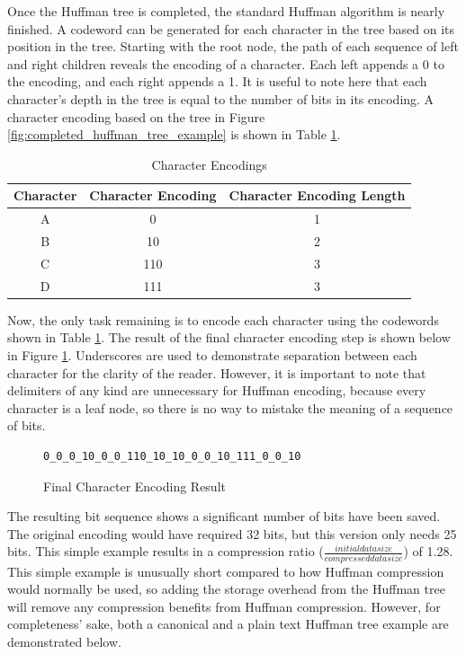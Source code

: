 \documentclass[doublespace,nopageskip]{VTthesis}
\begin{document}
Once the Huffman tree is completed, the standard Huffman algorithm is nearly finished. A codeword can be generated for each character in the tree based on its position in the tree. Starting with the root node, the path of each sequence of left and right children reveals the encoding of a character. Each left appends a 0 to the encoding, and each right appends a 1. It is useful to note here that each character's depth in the tree is equal to the number of bits in its encoding. A character encoding based on the tree in Figure \ref{fig:completed_huffman_tree_example} is shown in Table \ref{tab:huffman_encodings}.

\begin{table}[htb]
	\centering
	\caption{Character Encodings}
	\begin{tabular}{ccc}
	    \toprule
	    Character & Character Encoding & Character Encoding Length\\
	    \midrule
	    A & 0 & 1\\
	    \midrule
	    B & 10 & 2\\
	    \midrule
	    C & 110 & 3\\
	    \midrule
	    D & 111 & 3\\
	    \bottomrule
	\end{tabular}
	\label{tab:huffman_encodings}
\end{table}

Now, the only task remaining is to encode each character using the codewords shown in Table \ref{tab:huffman_encodings}. The result of the final character encoding step is shown below in Figure \ref{fig:finalcharacterencodingresult}. Underscores are used to demonstrate separation between each character for the clarity of the reader. However, it is important to note that delimiters of any kind are unnecessary for Huffman encoding, because every character is a leaf node, so there is no way to mistake the meaning of a sequence of bits.

\begin{figure}[htb]
	\centering
    \begin{lstlisting}
0_0_0_10_0_0_110_10_10_0_0_10_111_0_0_10
    \end{lstlisting}
	\caption{Final Character Encoding Result}
	\label{fig:finalcharacterencodingresult}
\end{figure}

The resulting bit sequence shows a significant number of bits have been saved. The original encoding would have required 32 bits, but this version only needs 25 bits. This simple example results in a compression ratio ($\frac{initial data size}{compressed data size}$) of 1.28. This simple example is unusually short compared to how Huffman compression would normally be used, so adding the storage overhead from the Huffman tree will remove any compression benefits from Huffman compression. However, for completeness' sake, both a canonical and a plain text Huffman tree example are demonstrated below.
\end{document}
